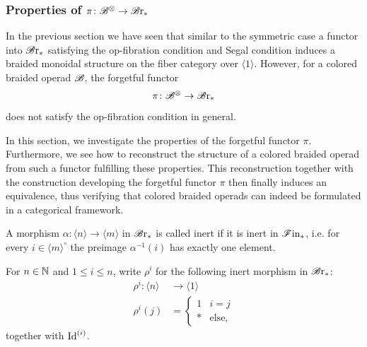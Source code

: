 \subsubsection{Properties of $\pi \colon \mathscr{B}^{\otimes} \to \mathscr{B} \text{r}_{\ast}$}

In the previous section we have seen that similar to the symmetric case a 
functor into $\mathscr{B} \text{r}_{\ast}$ satisfying the op-fibration condition and Segal condition
induces a braided monoidal structure on the fiber category over $\langle 1
\rangle$. However, for a colored braided operad $\mathscr{B}$, the forgetful functor
\[
    \pi \colon \mathscr{B}^{\otimes} \to \mathscr{B} \text{r}_{\ast}
\]
does not satisfy the op-fibration condition in general. 

In this section,
we investigate the properties of the forgetful functor $\pi$. Furthermore, we
see how to reconstruct the structure of a colored braided operad from such a
functor fulfilling these properties. This reconstruction together with the construction developing the forgetful functor $\pi$
then finally induces an equivalence, thus verifying that colored braided operads can indeed be formulated
in a categorical framework.

\begin{defin}
    A morphism $\alpha \colon \langle n \rangle \to  \langle m \rangle$ in
    $\mathscr{B} \text{r}_{\ast}$ is called inert if it is inert in $\mathscr{F} \text{in}_{\ast}$, i.e. for every $i \in
    \langle m \rangle^{\circ}$ the preimage $\alpha^{-1}(i)$ has exactly one
    element.
\end{defin}

\begin{eg}\label{eg:rho_i} For $n \in \mathbb{N}$ and $1 \leq i \leq n$, write $\rho^i$
    for the following inert morphism in $\mathscr{B} \text{r}_{\ast}$:
    \begin{align*}
        \rho^i \colon \langle n \rangle &\to  \langle 1 \rangle \\
        \rho^i (j) &= 
        \begin{cases}
            1 & i=j \\
            * & \text{else},
        \end{cases}
    \end{align*}
    together with $\operatorname{Id}^{(i)}$. 
\end{eg}



